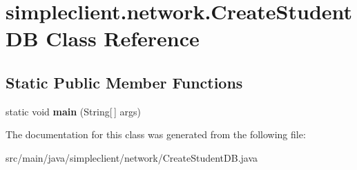 \hypertarget{classsimpleclient_1_1network_1_1CreateStudentDB}{}\section{simpleclient.\+network.\+Create\+Student\+DB Class Reference}
\label{classsimpleclient_1_1network_1_1CreateStudentDB}
\subsection*{Static Public Member Functions}
\begin{DoxyCompactItemize}
\item 
\mbox{\label{classsimpleclient_1_1network_1_1CreateStudentDB_a114c68b03678c45f430e47f2c4749608}} 
static void {\bfseries main} (String\mbox{[}$\,$\mbox{]} args)
\end{DoxyCompactItemize}


The documentation for this class was generated from the following file\+:\begin{DoxyCompactItemize}
\item 
src/main/java/simpleclient/network/Create\+Student\+D\+B.\+java\end{DoxyCompactItemize}
